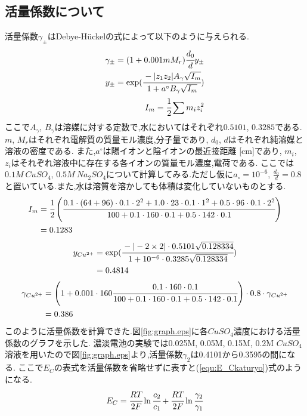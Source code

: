 \subsection{活量係数について}
\label{sec:katuryo}
活量係数$\gamma_{\pm}$はDebye-H\"{u}ckelの式によって以下のように与えられる\cite{kiso}.
\begin{align}
  \label{debye}
  \gamma_{\pm}=(1+0.001mM_r)\cfrac{d_0}{d}y_{\pm}\\
  y_{\pm}=\exp(\cfrac{-|z_1z_2|A_{\gamma}\sqrt{I_m}}{1+a^{\circ}B_{\gamma}\sqrt{I_m}})\\
  I_m=\cfrac{1}{2}\sum m_iz_i^2
\end{align}
ここで$A_{\gamma}$, $B_{\gamma}$は溶媒に対する定数で,水においてはそれぞれ$0.5101$, $0.3285$である.
$m$, $M_r$はそれぞれ電解質の質量モル濃度,分子量であり, $d_0$, $d$はそれぞれ純溶媒と溶液の密度である.
また,$a^{\circ}$は陽イオンと陰イオンの最近接距離 [cm]であり, $m_i$, $z_i$はそれぞれ溶液中に存在する各イオンの質量モル濃度,電荷である.
ここでは$0.1M\ CuSO_4$, $0.5M\ Na_2SO_4$について計算してみる.ただし仮に$a_{\circ}=10^{-6}$, $\tfrac{d_0}{d}=0.8$と置いている.また,水は溶質を溶かしても体積は変化していないものとする.
\begin{align*}
  I_m&=\cfrac{1}{2}\left(\cfrac{0.1\cdot\left(64+96\right)\cdot0.1\cdot2^2+1.0\cdot23\cdot0.1\cdot1^2+0.5\cdot96\cdot0.1\cdot2^2}{100+0.1\cdot160\cdot0.1+0.5\cdot142\cdot0.1}\right)\\
  &=0.1283
\end{align*}
\begin{align*}
  y_{Cu^{2+}}&=\exp(\cfrac{-|-2\times2|\cdot0.5101\sqrt{0.128334}}{1+10^{-6}\cdot0.3285\sqrt{0.128334}})\\
  &=0.4814
\end{align*}
\begin{align*}
  \gamma_{Cu^{2+}}&=\left(1+0.001\cdot160\cfrac{0.1\cdot160\cdot0.1}{100+0.1\cdot160\cdot0.1+0.5\cdot142\cdot0.1}\right)\cdot0.8\cdot\gamma_{Cu^{2+}}\\
  &=0.386
\end{align*}
このように活量係数を計算できた.図\ref{fig:graph.eps}に各$CuSO_4$濃度における活量係数のグラフを示した.
濃淡電池の実験では0.025M, 0.05M, 0.15M, 0.2M $CuSO_4$溶液を用いたので図\ref{fig:graph.eps}より,活量係数$\gamma_2$は0.4101から0.3595の間になる.
ここで$E_C$の表式を活量係数を省略せずに表すと(\ref{equ:E_Ckaturyo})式のようになる.
\begin{equation}
  \label{equ:E_Ckaturyo}
  E_C=\cfrac{RT}{2F}\ln \cfrac{c_2}{c_1} + \cfrac{RT}{2F}\ln \cfrac{\gamma_2}{\gamma_1}
\end{equation}

